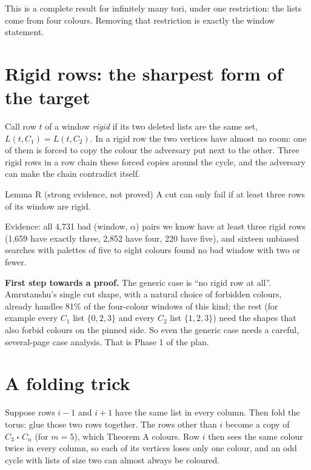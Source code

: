 \documentclass[11pt,oneside,openany]{book}
\newcommand{\T}{\mathbin{\square}}
\begin{document}
\begin{plainwords}
This is a complete result for infinitely many tori, under one restriction: the lists come from four
colours. Removing that restriction is exactly the window statement.
\end{plainwords}

\section{Rigid rows: the sharpest form of the target}

Call row $t$ of a window \emph{rigid} if its two deleted lists are the same set, $L(t,C_1) =
L(t,C_2)$. In a rigid row the two vertices have almost no room: one of them is forced to copy the
colour the adversary put next to the other. Three rigid rows in a row chain these forced copies
around the cycle, and the adversary can make the chain contradict itself.

\begin{partialbox}{Lemma R (strong evidence, not proved)}
A cut can only fail if at least three rows of its window are rigid.
\end{partialbox}

Evidence: all 4,731 bad (window, $\alpha$) pairs we know have at least three rigid rows (1,659 have
exactly three, 2,852 have four, 220 have five), and sixteen unbiased searches with palettes of five to
eight colours found no bad window with two or fewer.

\textbf{First step towards a proof.} The generic case is ``no rigid row at all''. Amrutanshu's
single cut shape, with a natural choice of forbidden colours, already handles 81\% of the
four-colour windows of this kind; the rest (for example every $C_1$ list $\{0,2,3\}$ and every $C_2$
list $\{1,2,3\}$) need the shapes that also forbid colours on the pinned side. So even the generic
case needs a careful, several-page case analysis. That is Phase 1 of the plan.

\section{A folding trick}

Suppose rows $i-1$ and $i+1$ have the same list in every column. Then fold the torus: glue those
two rows together. The rows other than $i$ become a copy of $C_3 \T C_n$ (for $m = 5$), which
Theorem A colours. Row $i$ then sees the same colour twice in every column, so each of its vertices
loses only one colour, and an odd cycle with lists of size two can almost always be coloured.
\end{document}
